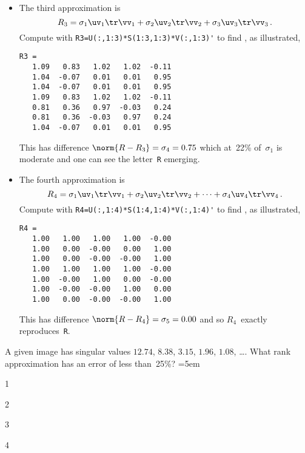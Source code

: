 \begin{example}
\begin{solution}
\begin{itemize}
\item The third approximation is 
\begin{equation*}
R_3=\sigma_1\uv_1\tr\vv_1 +\sigma_2\uv_2\tr\vv_2 +\sigma_3\uv_3\tr\vv_3\,.
\end{equation*}
Compute with \verb|R3=U(:,1:3)*S(1:3,1:3)*V(:,1:3)'| to find \twodp, as illustrated, 
\marginpar{}
\begin{verbatim}
R3 =
   1.09   0.83   1.02   1.02  -0.11
   1.04  -0.07   0.01   0.01   0.95
   1.04  -0.07   0.01   0.01   0.95
   1.09   0.83   1.02   1.02  -0.11
   0.81   0.36   0.97  -0.03   0.24
   0.81   0.36  -0.03   0.97   0.24
   1.04  -0.07   0.01   0.01   0.95
\end{verbatim}
This has difference \(\norm{R-R_3}=\sigma_4=0.75\) which at~22\% of~\(\sigma_1\) is moderate and one can see the letter~\verb|R| emerging.
 
\item The fourth approximation is 
\begin{equation*}
R_4=\sigma_1\uv_1\tr\vv_1+\sigma_2\uv_2\tr\vv_2+\cdots+\sigma_4\uv_4\tr\vv_4\,.
\end{equation*}
Compute with \verb|R4=U(:,1:4)*S(1:4,1:4)*V(:,1:4)'| to find \twodp, as illustrated, 
\marginpar{}
\begin{verbatim}
R4 =
   1.00   1.00   1.00   1.00  -0.00
   1.00   0.00  -0.00   0.00   1.00
   1.00   0.00  -0.00  -0.00   1.00
   1.00   1.00   1.00   1.00  -0.00
   1.00  -0.00   1.00   0.00  -0.00
   1.00  -0.00  -0.00   1.00   0.00
   1.00   0.00  -0.00  -0.00   1.00
\end{verbatim}
This has difference \(\norm{R-R_4}=\sigma_5=0.00\) and so \(R_4\)~exactly reproduces~\verb|R|.
 
\end{itemize}
\end{solution}
\end{example}




\begin{activity}
A given image has singular values \(12.74\), \(8.38\), \(3.15\), \(1.96\), \(1.08\), \ldots. 
What rank approximation has an error of less than~25\%?
\partswidth=5em
\begin{parts}
\item 1
\item 2
\item 3
\item 4
\end{parts}
\end{activity}





